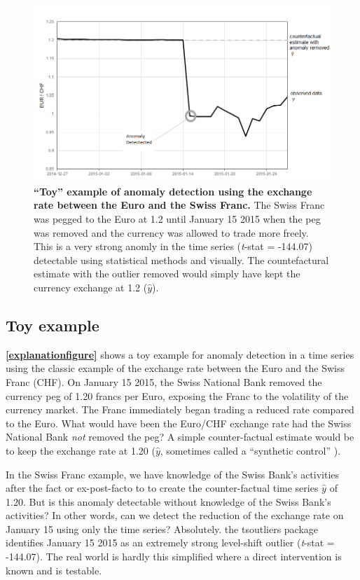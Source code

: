 \documentclass[12pt]{article}
\begin{document}
\begin{figure}
\centering
\includegraphics{../MainDocument/MainDocument_files/figure-latex/Figure1.png}
\caption{\textbf{``Toy'' example of anomaly detection using the exchange
rate between the Euro and the Swiss Franc.} The Swiss Franc was pegged
to the Euro at 1.2 until January 15 2015 when the peg was removed and
the currency was allowed to trade more freely. This is a very strong
anomly in the time series (\emph{t}-stat = -144.07) detectable using
statistical methods and visually. The countefactural estimate with the
outlier removed would simply have kept the currency exchange at 1.2
(\(\hat{y}\)). \label{explanationfigure}}
\end{figure}

\hypertarget{toy-example}{%
\subsection{Toy example}\label{toy-example}}

\textbf{\autoref{explanationfigure}} shows a toy example for anomaly
detection in a time series using the classic example of the exchange
rate between the Euro and the Swiss Franc (CHF). On January 15 2015, the
Swiss National Bank removed the currency peg of 1.20 francs per Euro,
exposing the Franc to the volatility of the currency market. The Franc
immediately began trading a reduced rate compared to the Euro. What
would have been the Euro/CHF exchange rate had the Swiss National Bank
\emph{not} removed the peg? A simple counter-factual estimate would be
to keep the exchange rate at 1.20 (\(\hat{y}\), sometimes called a
``synthetic control'' \citep{abadie2010synthetic}).

In the Swiss Franc example, we have knowledge of the Swiss Bank's
activities after the fact or ex-post-facto to to create the
counter-factual time series \(\hat{y}\) of 1.20. But is this anomaly
detectable without knowledge of the Swiss Bank's activities? In other
words, can we detect the reduction of the exchange rate on January 15
using only the time series? Absolutely. the tsoutliers package
identifies January 15 2015 as an extremely strong level-shift outlier
(\emph{t}-stat = -144.07). The real world is hardly this simplified
where a direct intervention is known and is testable.
\end{document}
